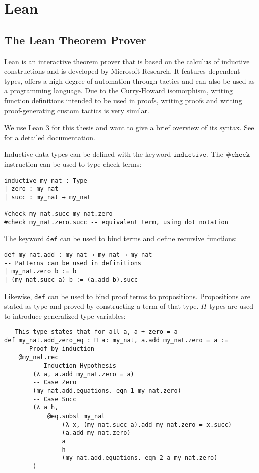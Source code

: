 \clearpage

\section{Lean}

\subsection{The Lean Theorem Prover}

Lean is an interactive theorem prover that is based on the calculus of inductive constructions \cite{leanWebsite} \cite{moura15} and is developed by Microsoft Research.
It features dependent types, offers a high degree of automation through tactics and can also be used as a programming language.
Due to the Curry-Howard isomorphism, writing function definitions intended to be used in proofs,
writing proofs and writing proof-generating custom tactics is very similar.

We use Lean 3 for this thesis and want to give a brief overview of its syntax. See \cite{leanDocs} for a detailed documentation.

Inductive data types can be defined with the keyword $\mathtt{inductive}$. The $\mathtt{\#check}$ instruction can be used to type-check terms:
\begin{verbatim}
inductive my_nat : Type
| zero : my_nat
| succ : my_nat → my_nat

#check my_nat.succ my_nat.zero
#check my_nat.zero.succ -- equivalent term, using dot notation
\end{verbatim}

The keyword $\mathtt{def}$ can be used to bind terms and define recursive functions:
\begin{verbatim}
def my_nat.add : my_nat → my_nat → my_nat
-- Patterns can be used in definitions
| my_nat.zero b := b
| (my_nat.succ a) b := (a.add b).succ
\end{verbatim}

Likewise, $\mathtt{def}$ can be used to bind proof terms to propositions.
Propositions are stated as type and proved by constructing a term of that type.
$\Pi$-types are used to introduce generalized type variables:
\begin{verbatim}
-- This type states that for all a, a + zero = a
def my_nat.add_zero_eq : Π a: my_nat, a.add my_nat.zero = a :=
    -- Proof by induction
    @my_nat.rec
        -- Induction Hypothesis
        (λ a, a.add my_nat.zero = a)
        -- Case Zero
        (my_nat.add.equations._eqn_1 my_nat.zero)
        -- Case Succ
        (λ a h,
            @eq.subst my_nat
                (λ x, (my_nat.succ a).add my_nat.zero = x.succ)
                (a.add my_nat.zero)
                a
                h
                (my_nat.add.equations._eqn_2 a my_nat.zero)
        )
\end{verbatim}

